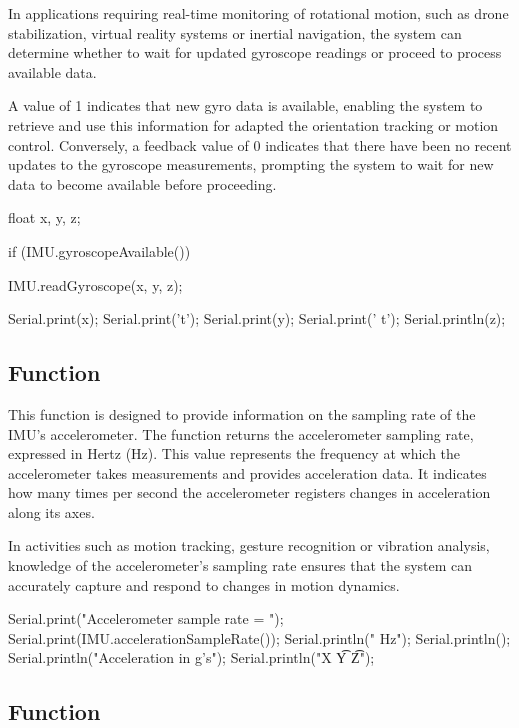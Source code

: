 In applications requiring real-time monitoring of rotational motion, such as drone stabilization, virtual reality systems or inertial navigation, the system can determine whether to wait for updated gyroscope readings or proceed to process available data.

A value of 1 indicates that new gyro data is available, enabling the system to retrieve and use this information for adapted the orientation tracking or motion control. Conversely, a feedback value of 0 indicates that there have been no recent updates to the gyroscope measurements, prompting the system to wait for new data to become available before proceeding.

\begin{Arduino}
    float x, y, z;
    
    if (IMU.gyroscopeAvailable()) {
        IMU.readGyroscope(x, y, z);
        
        Serial.print(x);
        Serial.print('t');
        Serial.print(y);
        Serial.print(' t');
        Serial.println(z); }
\end{Arduino}


\subsection{Function }

This function is designed to provide information on the sampling rate of the IMU's accelerometer. The function  returns the accelerometer sampling rate, expressed in Hertz (Hz). This value represents the frequency at which the accelerometer takes measurements and provides acceleration data. It indicates how many times per second the accelerometer registers changes in acceleration along its axes.

In activities such as motion tracking, gesture recognition or vibration analysis, knowledge of the accelerometer's sampling rate ensures that the system can accurately capture and respond to changes in motion dynamics. 

\begin{Arduino}
    Serial.print("Accelerometer sample rate = ");
    Serial.print(IMU.accelerationSampleRate());
    Serial.println(" Hz");
    Serial.println();
    Serial.println("Acceleration in g's");
    Serial.println("X \t Y  \t Z");
\end{Arduino}



\subsection{Function }

